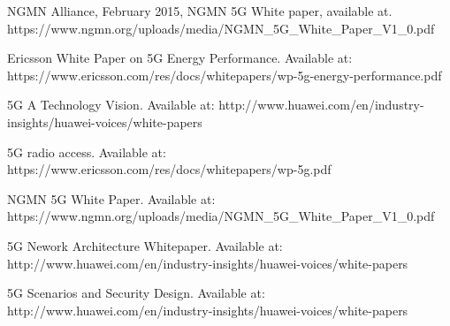 \documentclass[12pt]{llncs}
\begin{document}
\begin{thebibliography}{4}
 NGMN Alliance, February 2015, NGMN 5G White paper, available at. https://www.ngmn.org/uploads/media/NGMN\_5G\_White\_Paper\_V1\_0.pdf


 Ericsson White Paper on 5G Energy Performance. Available at: https://www.ericsson.com/res/docs/whitepapers/wp-5g-energy-performance.pdf

 5G A Technology Vision. Available at: http://www.huawei.com/en/industry-insights/huawei-voices/white-papers

 5G radio
access. Available at: https://www.ericsson.com/res/docs/whitepapers/wp-5g.pdf

 NGMN 5G White Paper. Available at: https://www.ngmn.org/uploads/media/NGMN\_5G\_White\_Paper\_V1\_0.pdf

 5G Nework Architecture Whitepaper. Available at: http://www.huawei.com/en/industry-insights/huawei-voices/white-papers

 5G Scenarios and Security Design. Available at: http://www.huawei.com/en/industry-insights/huawei-voices/white-papers



\end{thebibliography}
\end{document}
